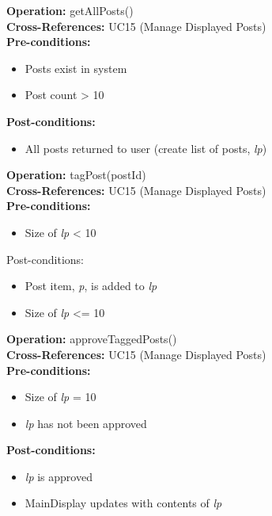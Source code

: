 \textbf{Operation:} getAllPosts() \\
\textbf{Cross-References:} UC15 (Manage Displayed Posts) \\
\textbf{Pre-conditions:}
\begin{itemize}
    \item Posts exist in system
    \item Post count > 10
\end{itemize}
\textbf{Post-conditions:}
\begin{itemize}
    \item All posts returned to user (create list of posts, \emph{lp})
\end{itemize}

\textbf{Operation:} tagPost(postId) \\
\textbf{Cross-References:} UC15 (Manage Displayed Posts) \\
\textbf{Pre-conditions: }
\begin{itemize}
    \item Size of \emph{lp} < 10
\end{itemize}
Post-conditions:
\begin{itemize}
    \item Post item, \emph{p}, is added to \emph{lp}
    \item Size of \emph{lp} <= 10
\end{itemize}

\textbf{Operation:} approveTaggedPosts() \\
\textbf{Cross-References:} UC15 (Manage Displayed Posts) \\
\textbf{Pre-conditions:}
\begin{itemize}
    \item Size of \emph{lp} = 10
    \item \emph{lp} has not been approved
\end{itemize}
\textbf{Post-conditions:}
\begin{itemize}
    \item \emph{lp} is approved
    \item MainDisplay updates with contents of \emph{lp}
\end{itemize}